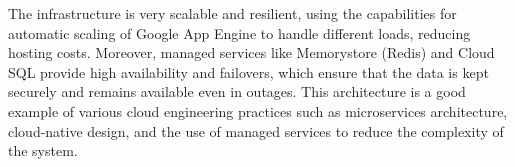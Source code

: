 The infrastructure is very scalable and resilient, using the capabilities for automatic scaling of Google App Engine to handle different loads, reducing hosting costs. Moreover, managed services like Memorystore (Redis) and Cloud SQL provide high availability and failovers, which ensure that the data is kept securely and remains available even in outages. This architecture is a good example of various cloud engineering practices such as microservices architecture, cloud-native design, and the use of managed services to reduce the complexity of the system.


